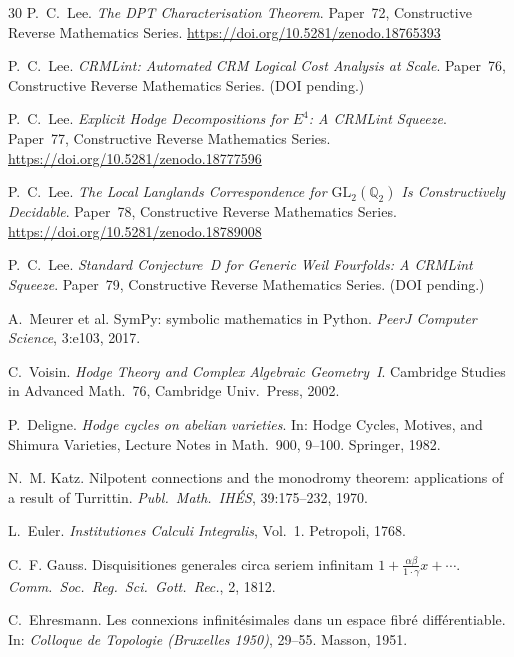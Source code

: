 \documentclass[11pt]{article}
\theoremstyle{plain}
\theoremstyle{definition}
\theoremstyle{remark}
\newcommand{\Q}{\mathbb{Q}}
\newcommand{\GL}{\mathrm{GL}}
\begin{document}
\begin{thebibliography}{30}
P.~C.~Lee.
\newblock \emph{The DPT Characterisation Theorem}.
\newblock Paper~72, Constructive Reverse Mathematics Series.
\newblock \url{https://doi.org/10.5281/zenodo.18765393}

P.~C.~Lee.
\newblock \emph{CRMLint: Automated CRM Logical Cost Analysis at Scale}.
\newblock Paper~76, Constructive Reverse Mathematics Series.
\newblock (DOI pending.)

P.~C.~Lee.
\newblock \emph{Explicit Hodge Decompositions for $E^4$:
  A CRMLint Squeeze}.
\newblock Paper~77, Constructive Reverse Mathematics Series.
\newblock \url{https://doi.org/10.5281/zenodo.18777596}

P.~C.~Lee.
\newblock \emph{The Local Langlands Correspondence for $\GL_2(\Q_2)$
  Is Constructively Decidable}.
\newblock Paper~78, Constructive Reverse Mathematics Series.
\newblock \url{https://doi.org/10.5281/zenodo.18789008}

P.~C.~Lee.
\newblock \emph{Standard Conjecture~D for Generic Weil Fourfolds:
  A CRMLint Squeeze}.
\newblock Paper~79, Constructive Reverse Mathematics Series.
\newblock (DOI pending.)

A.~Meurer et al.
\newblock SymPy: symbolic mathematics in Python.
\newblock \emph{PeerJ Computer Science}, 3:e103, 2017.

C.~Voisin.
\newblock \emph{Hodge Theory and Complex Algebraic Geometry~I}.
\newblock Cambridge Studies in Advanced Math.~76,
  Cambridge Univ.\ Press, 2002.

P.~Deligne.
\newblock \emph{Hodge cycles on abelian varieties}.
\newblock In: Hodge Cycles, Motives, and Shimura Varieties,
  Lecture Notes in Math.~900, 9--100. Springer, 1982.

N.~M. Katz.
\newblock Nilpotent connections and the monodromy theorem:
  applications of a result of Turrittin.
\newblock \emph{Publ.\ Math.\ IH\'ES}, 39:175--232, 1970.

L.~Euler.
\newblock \emph{Institutiones Calculi Integralis}, Vol.~1.
\newblock Petropoli, 1768.

C.~F. Gauss.
\newblock Disquisitiones generales circa seriem infinitam
  $1 + \frac{\alpha\beta}{1 \cdot \gamma}x + \cdots$.
\newblock \emph{Comm.\ Soc.\ Reg.\ Sci.\ Gott.\ Rec.}, 2, 1812.

C.~Ehresmann.
\newblock Les connexions infinit\'esimales dans un espace
  fibr\'e diff\'erentiable.
\newblock In: \emph{Colloque de Topologie (Bruxelles 1950)},
  29--55. Masson, 1951.

\end{thebibliography}
\end{document}
